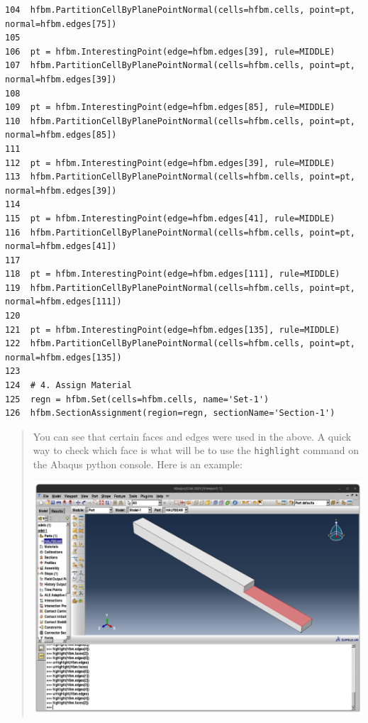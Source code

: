 \documentclass[11pt]{article}
\begin{document}
\begin{enumerate}
\begin{verbatim}
104  hfbm.PartitionCellByPlanePointNormal(cells=hfbm.cells, point=pt, normal=hfbm.edges[75])
105  
106  pt = hfbm.InterestingPoint(edge=hfbm.edges[39], rule=MIDDLE)
107  hfbm.PartitionCellByPlanePointNormal(cells=hfbm.cells, point=pt, normal=hfbm.edges[39])
108  
109  pt = hfbm.InterestingPoint(edge=hfbm.edges[85], rule=MIDDLE)
110  hfbm.PartitionCellByPlanePointNormal(cells=hfbm.cells, point=pt, normal=hfbm.edges[85])
111  
112  pt = hfbm.InterestingPoint(edge=hfbm.edges[39], rule=MIDDLE)
113  hfbm.PartitionCellByPlanePointNormal(cells=hfbm.cells, point=pt, normal=hfbm.edges[39])
114  
115  pt = hfbm.InterestingPoint(edge=hfbm.edges[41], rule=MIDDLE)
116  hfbm.PartitionCellByPlanePointNormal(cells=hfbm.cells, point=pt, normal=hfbm.edges[41])
117  
118  pt = hfbm.InterestingPoint(edge=hfbm.edges[111], rule=MIDDLE)
119  hfbm.PartitionCellByPlanePointNormal(cells=hfbm.cells, point=pt, normal=hfbm.edges[111])
120  
121  pt = hfbm.InterestingPoint(edge=hfbm.edges[135], rule=MIDDLE)
122  hfbm.PartitionCellByPlanePointNormal(cells=hfbm.cells, point=pt, normal=hfbm.edges[135])
123  
124  # 4. Assign Material
125  regn = hfbm.Set(cells=hfbm.cells, name='Set-1')
126  hfbm.SectionAssignment(region=regn, sectionName='Section-1')
\end{verbatim}
\end{enumerate}
\begin{quote}
                              \begin{tcolorbox}[colback=osbe-bg,colframe=osbe-fg,title={Scripting note},sharp corners,boxrule=0.4pt]
You can see that certain faces and edges were used in the above.
A quick way to check which face is what will be to use the \texttt{highlight} command on the Abaqus python console.
Here is an example:
\begin{center}
\includegraphics[width=.9\linewidth]{./figs/highl.png}
\end{center}


               \end{tcolorbox}
\end{quote}
\end{document}
